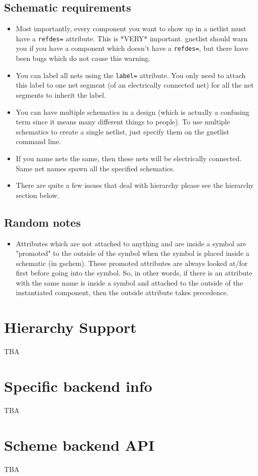 \documentclass{article}
\begin{document}
\subsection{Schematic requirements}
\begin{itemize}
\item Most importantly, every component you want to show up in a
  netlist must have a {\tt refdes=} attribute.  This is *VERY* important.
  gnetlist should warn you if you have a component which doesn't have
  a {\tt refdes=}, but there have been bugs which do not cause this warning.
  
\item You can label all nets using the {\tt label=} attribute.  You only
  need to attach this label to one net segment (of an electrically
  connected net) for all the net segments to inherit the label.
  
\item You can have multiple schematics in a design (which is actually
  a confusing term since it means many different things to people).
  To use multiple schematics to create a single netlist, just specify
  them on the gnetlist command line.
  
\item If you name nets the same, then these nets will be electrically
  connected.  Same net names spawn all the specified schematics.
  
\item There are quite a few issues that deal with hierarchy please see
  the hierarchy section below.
\end{itemize}
           
\subsection{Random notes}
\begin{itemize}
\item Attributes which are not attached to anything and are inside a
  symbol are "promoted" to the outside of the symbol when the symbol
  is placed inside a schematic (in gschem).  These promoted attributes
  are always looked at/for first before going into the symbol.  So, in
  other words, if there is an attribute with the same name is inside a
  symbol and attached to the outside of the instantiated component,
  then the outside attribute takes precedence.
\end{itemize}


\section{Hierarchy Support}
TBA

\section{Specific backend info}
TBA

\section{Scheme backend API}
TBA
\end{document}
